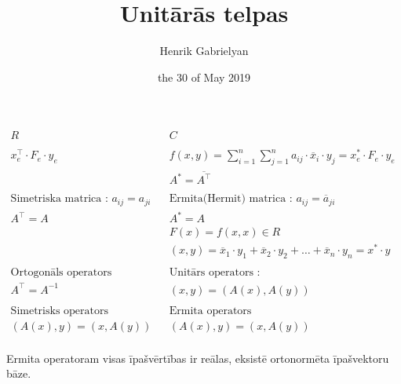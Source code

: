 \documentclass[12pt]{article}
\title{Unitārās telpas}
\author{Henrik Gabrielyan}
\date{the 30 of May 2019}
\begin{document}
\maketitle

\begin{align*}
	R &  & C  & & \\
	\\
 	x_e^{\intercal} \cdot F_e \cdot y_e       & &      f(x,y) = \sum_{i = 1}^{n}  \sum_{j = 1}^{n}  a_{ij} \cdot \overline{x}_i \cdot y_j = x^{*}_e \cdot F_e \cdot y_e & & \\
	& & 	 A^{*} = \overline{A^{\intercal}} & &\\
	\\
 	\text{Simetriska matrica : } a_{ij} = a_{ji}    & &    \text{Ermita(Hermit) matrica : } a_{ij} = \overline{a}_{ji}  & & \\
	 A^{\intercal} = A     & &    A^* = A  & & \\
 	& &    F(x) = f(x,x) \in R & & \\
	& &    (x,y) = \overline{x}_1 \cdot y_1 + \overline{x}_2 \cdot y_2 + \ldots + \overline{x}_n \cdot y_n = x^* \cdot y & & \\
	\\ 
 	\text{Ortogonāls operators}    & &    \text{Unitārs operators : } & &\\
	 A^{\intercal} = A^{-1}    & &    (x,y) = (A(x), A(y)) & & \\
	 \\
 	\text{Simetrisks operators}    & &    \text{Ermita operators} & &\\
 	(A(x),y) = (x,A(y))    & &    (A(x),y) = (x,A(y)) & &\\
\end{align*}

Ermita operatoram visas īpašvērtības ir reālas, eksistē ortonormēta īpašvektoru bāze. \\
\end{document}
